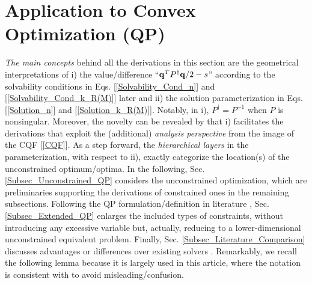 \documentclass[9pt,twocolumn,twoside,lineno]{pnas-new-1}
\newcommand{\bfq}{{\bf q}}
\theoremstyle{remark}
\begin{document}
\section{Application to Convex Optimization (QP)}
\label{Sec_Convex_Optimization}
\textit{The main concepts} behind all the derivations in this section are the geometrical interpretations of i) the value/difference
``$\bfq^TP^\dagger\bfq/2-s$'' according to the solvability conditions in Eqs. [\ref{Solvability_Cond_n}] and [\ref{Solvability_Cond_k_R(M)}] later and ii) the solution parameterization in Eqs. [\ref{Solution_n}] and [\ref{Solution_k_R(M)}]. Notably, in i), $P^\dagger=P^{-1}$ when $P$ is nonsingular. Moreover, the novelty can be revealed by that i) facilitates the derivations that exploit the (additional) \textit{analysis perspective} from the image of the CQF [\ref{CQF}]. As a step forward, the \textit{hierarchical layers} in the parameterization, with respect to ii), exactly categorize the location(s) of the unconstrained optimum/optima. In the following, Sec. \ref{Subsec_Unconstrained_QP} considers the unconstrained optimization, which are preliminaries supporting the derivations of constrained ones in the remaining subsections. Following the QP formulation/definition in literature \citep{BoVa:04,Lu(Ye):03(16)}, Sec. \ref{Subsec_Extended_QP} enlarges the included types of constraints, without introducing any excessive variable but, actually, reducing to a lower-dimensional unconstrained equivalent problem. Finally, Sec. \ref{Subsec_Literature_Comparison} discusses advantages or differences over existing solvers \citep{NoWr:06}. Remarkably, we recall the following lemma because it is largely used in this article, where the notation is consistent with \cite{LiLiHs:draft,LiLiHs:20} to avoid misleading/confusion.
\end{document}
